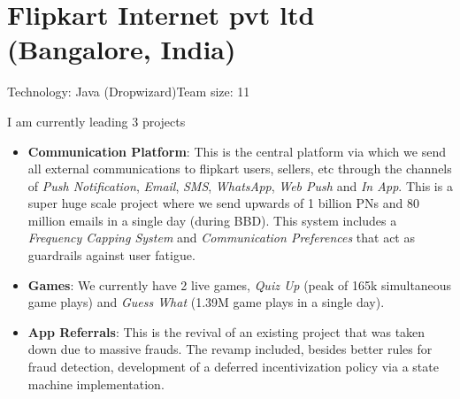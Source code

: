 \documentclass[11pt,a4paper,sans]{moderncv} %
\begin{document}
\newpage{}
\section{Flipkart Internet pvt ltd (Bangalore, India)}
         {Technology: Java (Dropwizard)}{Team size: 11}
         {I am currently leading 3 projects
           \begin{itemize}
           \item \textbf{Communication Platform}: This is the central platform via which we send all external communications to flipkart users, sellers, etc through the channels of \textit{Push Notification}, \textit{Email},  \textit{SMS}, \textit{WhatsApp}, \textit{Web Push} and \textit{In App}. This is a super huge scale project where we send upwards of 1 billion PNs and 80 million emails in a single day (during BBD). This system includes a \textit{Frequency Capping System} and \textit{Communication Preferences} that act as guardrails against user fatigue.
           \item \textbf{Games}: We currently have 2 live games, \textit{Quiz Up} (peak of 165k simultaneous game plays) and \textit{Guess What} (1.39M game plays in a single day).
           \item \textbf{App Referrals}: This is the revival of an existing project that was taken down due to massive frauds. The revamp included, besides better rules for fraud detection, development of a deferred incentivization policy via a state machine implementation.
           \end{itemize}}
\end{document}
